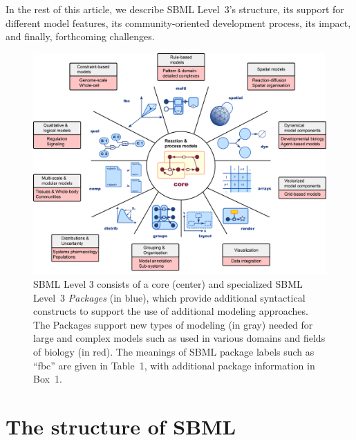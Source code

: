 \documentclass[]{draft-sbml-paper}
\begin{document}
In the rest of this article, we describe SBML Level~3's structure, its support for different model features, its community-oriented development process, its impact, and finally, forthcoming challenges.

\begin{figure}[b]
  \center
  \includegraphics[width=\textwidth]{res/SBML-Level3-v08.png}
\caption{SBML Level 3 consists of a core (center) and specialized SBML Level~3 \emph{Packages} (in blue), which provide additional syntactical constructs to support the use of additional modeling approaches. The Packages support new types of modeling (in gray) needed for large and complex models such as used in various domains and fields of biology (in red). The meanings of SBML package labels such as ``fbc'' are given in Table~1, with additional package information in Box~1.}
\label{level-3-diagram}
\end{figure}

\clearpage
\newpage

\section*{The structure of SBML}
\label{sec:sbml}
\end{document}
